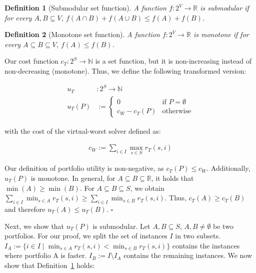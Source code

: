 \documentclass[conference]{IEEEtran}
\newtheorem{definition}{Definition}
\begin{document}
\begin{definition}[Submodular set function]
	A function $f : 2^V \rightarrow \mathbb{R}$ is submodular if for every $A, B \subseteq V$, $f(A \cap B) + f(A \cup B) \leq f(A) + f(B)$.
	\label{def:submodular}
\end{definition}

\begin{definition}[Monotone set function]
	A function $f : 2^V \rightarrow \mathbb{R}$ is monotone if for every $A \subseteq B \subseteq V$, $f(A) \leq f(B)$.
	\label{def:monotone}
\end{definition}

Our cost function $c_{T}: 2^S \rightarrow \mathbb{N}$ is a set function, but it is non-increasing instead of non-decreasing (monotone).
Thus, we define the following transformed version:

\begin{align*}
	u_{T} &: 2^S \rightarrow \mathbb{N}\\
	u_{T}(P) &:= \begin{cases}
		0 & \text{if }P=\emptyset\\
		c_W - c_{T}(P) & \text{otherwise}
	\end{cases} \tag*{Portfolio Utility}
\end{align*}

with the cost of the virtual-worst solver defined as:

\begin{align*}
	c_W := \sum_{i \in I}{\max_{s \in S}{r_T(s,i)}} \tag*{Virtual Worst Solver}
\end{align*}

Our definition of portfolio utility is non-negative, as $c_{T}(P) \leq c_W$.
Additionally, $u_{T}(P)$ is monotone.
In general, for $A \subseteq B \subseteq \mathbb{R}$, it holds that $\min(A) \geq \min(B)$.
For $A \subseteq B \subseteq S$, we obtain $\sum_{i \in I}{\min_{s \in A}{r_T(s,i)}} \geq \sum_{i \in I}{\min_{s \in B}{r_T(s,i)}}$.
Thus, $c_{T}(A) \geq c_{T}(B)$ and therefore $u_{T}(A) \leq u_{T}(B)$. \hfill$\square$

Next, we show that $u_{T}(P)$ is submodular.
Let $A,B \subseteq S$, $A,B \neq \emptyset$ be two portfolios.
For our proof, we split the set of instances $I$ in two subsets.
$I_A := \{i \in I \mid \min_{s \in A}{r_T(s,i)} < \min_{s \in B}{r_T(s,i)} \}$ contains the instances where portfolio A is faster.
$I_B := I \setminus I_A$ contains the remaining instances.
We now show that Definition~\ref{def:submodular} holds:
\end{document}
